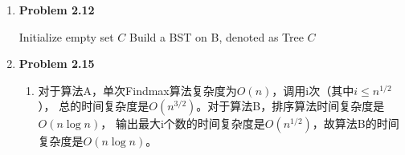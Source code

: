 \documentclass{ctexart}
\begin{document}
\begin{enumerate}[label=\arabic*.]
\begin{enumerate}[label= (\arabic*)]
\begin{algorithm}[H]
            \end{algorithm}
            \item 一个朴素的想法是直接建立哈希表统计次数，但由于能判断相等$\ne$可哈希，故不行。\\
            考虑如下的找candidate算法。\\
            \begin{algorithm}[H]
                \SetAlgoLined
                \caption{只能判等情况下是否存在主元素}
                Initialize $candidate\leftarrow none$, $count\leftarrow 0$\;
                Scan $A$ to calculate the times of $candidate$\, denoted as $times$\;
            \end{algorithm}
        \end{enumerate}
    \item \textbf{Problem 2.12}\\
        \begin{algorithm}[H]
            \SetAlgoLined
            \caption{找到给定两个集合的交集}
            Initialize empty set $C$\;
            Build a BST on B, denoted as Tree
            \Return $C$\;
        \end{algorithm}
    \item \textbf{Problem 2.15}
        \begin{enumerate}[label= (\arabic*)]
            \item 对于算法A，单次Findmax算法复杂度为$O(n)$，调用i次（其中$i\le{n^{1/2}}$），
            总的时间复杂度是$O(n^{3/2})$。对于算法B，排序算法时间复杂度是$O(n\log{n})$，
            输出最大i个数的时间复杂度是$O(n^{1/2})$，故算法B的时间复杂度是$O(n\log{n})$。

\end{enumerate}
\end{enumerate}
\end{document}
